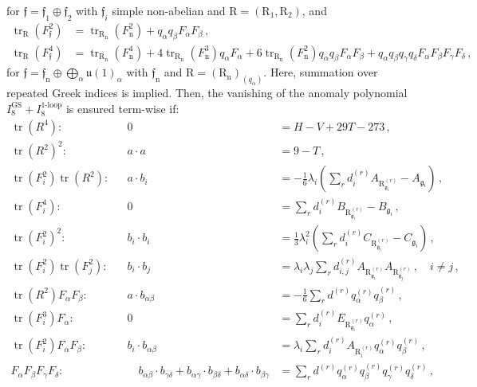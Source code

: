 \documentclass[11pt, a4paper]{article}
\newcommand*{\fkf}{\ensuremath{\mathfrak{f}}}
\newcommand*{\fkg}{\ensuremath{\mathfrak{g}}}
\newcommand*{\fku}{\ensuremath{\mathfrak{u}}}
\DeclareMathOperator{\trace}{tr}
\newcommand*{\irrep}[2]{\ensuremath{\bm{\mathrm{R}}_{#1}^{(#2)}}}
\newcommand*{\charge}[2]{\ensuremath{q_{#1}^{(#2)}}}
\newcommand*{\birrep}{\ensuremath{\bm{\mathrm{R}}}}
\begin{document}
for $\fkf = \fkf_1 \oplus \fkf_2$ with $\fkf_i$ simple non-abelian and $\birrep = (\birrep_1 , \birrep_2)$, and
\begin{align}\label{eq:decomposing_trace_ab}
    \trace_{\birrep}(F_\fkf^2) &= \trace_{\birrep_\text{n}} (F_\text{n}^2) +  q_{\alpha} q_{\beta} F_{\alpha} F_{\beta} \, , \\
    \trace_{\birrep}(F_\fkf^4) &= \trace_{\birrep_\text{n}} (F_\text{n}^4) + 4 \trace_{\birrep_\text{n}}(F_\text{n}^3)  q_{\alpha} F_{\alpha} + 6 \trace_{\birrep_\text{n}}(F_\text{n}^2) q_{\alpha} q_{\beta} F_{\alpha} F_{\beta} + q_{\alpha} q_{\beta} q_{\gamma} q_{\delta} F_{\alpha} F_{\beta} F_{\gamma} F_{\delta} \, ,
\end{align}
for $\fkf = \fkf_\text{n} \oplus \bigoplus_{\alpha} \fku(1)_{\alpha}$ with $\fkf_\text{n}$ and $ \birrep = (\birrep_\text{n})_{(q_\alpha)}$. Here, summation over repeated Greek indices is implied.
Then, the vanishing of the anomaly polynomial $I_8^\text{GS} + I_8^\text{1-loop}$ is ensured term-wise if:
\begin{subequations}
    \label{eq:6dAC}
    \begin{alignat}{2}
        \trace(R^4)\colon && 0 &= H - V + 29 T - 273 \, , \label{eq:nonabelACgrav} \\
        \trace(R^2)^2\colon && a \cdot a &= 9 - T\,, \label{eq:nonabelACa} \\
        \trace(F_i^2) \trace(R^2)\colon && a \cdot b_i &= -\frac{1}{6} \lambda_i \left(\sum_r d_i^{(r)} A_{\irrep{\fkg_i}{r}} - A_{\fkg_i}\right)\,, \label{eq:nonabelACA} \\
        \trace(F_i^4)\colon && 0 &= \sum_r d_i^{(r)} B_{\irrep{\fkg_i}{r}} - B_{\fkg_i}\,, \label{eq:nonabelACB} \\
        \trace(F_i^2)^2\colon && b_i \cdot b_i &= \frac{1}{3} \lambda_i^2 \left(\sum_r d_i^{(r)} C_{\irrep{\fkg_i}{r}} - C_{\fkg_i}\right)\,, \label{eq:nonabelACC} \\
        \trace(F_i^2) \trace(F_j^2)\colon && b_i \cdot b_j &= \lambda_i \lambda_j \sum_r d_{i,j}^{(r)} A_{\irrep{\fkg_i}{r}} A_{\irrep{\fkg_j}{r}}\,, \quad i \ne j \,, \label{eq:nonabelACmix} \\
        \trace(R^2) F_\alpha F_\beta\colon && a \cdot b_{\alpha \beta} &= -\frac{1}{6} \sum_r d^{(r)} \charge{\alpha}{r} \charge{\beta}{r}\,, \label{eq:abelACsqr} \\
        \trace(F_i^3) F_\alpha\colon && 0 &= \sum_r d_i^{(r)} E_{\irrep{\fkg_i}{r}} \charge{\alpha}{r}\,, \label{eq:abelACE} \\
        \trace(F_i^2)F_\alpha F_\beta\colon && b_i \cdot b_{\alpha \beta} &= \lambda_i \sum_r d_i^{(r)} A_{\irrep{i}{r}} \charge{\alpha}{r} \charge{\beta}{r}\,, \label{eq:abelACA} \\
        F_\alpha F_\beta F_\gamma F_\delta\colon && \quad b_{\alpha \beta} \cdot b_{\gamma \delta} + b_{\alpha \gamma} \cdot b_{\beta \delta} + b_{\alpha \delta} \cdot b_{\beta \gamma} &= \sum_r d^{(r)} \charge{\alpha}{r} \charge{\beta}{r} \charge{\gamma}{r} \charge{\delta}{r}\,, \label{eq:abelACquar}
    \end{alignat}
\end{subequations}
\end{document}
